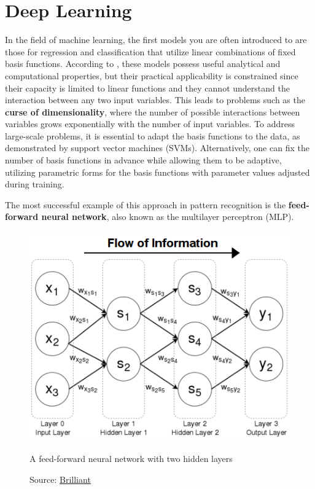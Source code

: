 \section{Deep Learning}

In the field of machine learning, the first models you
are often introduced to are those for regression
and classification that utilize linear
combinations of fixed basis functions.
According to \cite{Bishop:2008aa},
these models possess useful analytical and computational properties,
but their practical applicability is constrained 
since their capacity is limited to linear functions
and they cannot understand the interaction between any two input variables.
This leads to problems such as the \textbf{curse of dimensionality},
where the number of possible interactions between variables grows exponentially
with the number of input variables.
To address large-scale problems, it is essential to adapt the basis functions
to the data, as demonstrated by support vector machines (SVMs).
Alternatively, one can fix the number of basis functions in advance while
allowing them to be adaptive, utilizing parametric forms for the basis
functions with parameter values adjusted during training.

The most successful example of this approach in pattern recognition is the
\textbf{feed-forward neural network},
also known as the multilayer perceptron (MLP).
\begin{figure}[h]
    \centering
    \includegraphics[width=.75\textwidth]{figures/ch3/1.mlp.png}
    \caption{A feed-forward neural network with two hidden layers}
    \vspace{-10px}
    \caption*{\scriptsize{Source: \href{https://brilliant.org/wiki/feedforward-neural-networks/}{Brilliant}}}
    \label{fig:mlp}
\end{figure}


